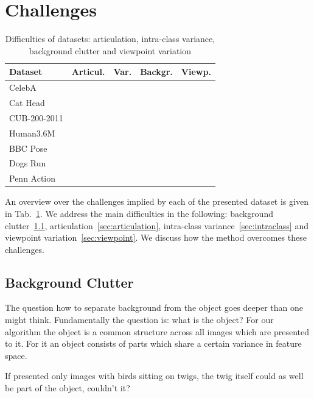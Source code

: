 
\section{Challenges}\label{sec:challenges}
	\begin{table}
		\centering
		\caption{Difficulties of datasets: articulation, intra-class variance, background clutter and viewpoint variation}
		\label{tab:challenges}
		\begin{tabular}{l|rrrr}
			\hline
			Dataset &  Articul.& Var. &  Backgr.& Viewp.  \\ \hline
			CelebA &   &  &  &    \\
			Cat Head & &  \checkmark&  &   \\
			CUB-200-2011 & & \checkmark& \checkmark&   \\
			Human3.6M &\checkmark& &  & \checkmark  \\
			BBC Pose &  \checkmark&  & \checkmark&  \\
			Dogs Run & \checkmark& \checkmark& \checkmark&   \\
			Penn Action & \checkmark& \checkmark& \checkmark& \checkmark  \\
			\hline
		\end{tabular}
	\end{table}
	An overview over the challenges implied by each of the presented dataset is given in Tab.~\ref{tab:challenges}. We address the main difficulties in the following: background clutter~\ref{sec:background}, articulation~\ref{sec:articulation}, intra-class variance~\ref{sec:intraclass} and viewpoint variation~\ref{sec:viewpoint}.
	We discuss how the method overcomes these challenges.



	\subsection{Background Clutter}\label{sec:background}

		The question how to separate background from the object goes deeper than one might think. Fundamentally the question is: what is the object?
		For our algorithm the object is a common structure across all images which are presented to it. For it an object consists of parts which share a certain variance in feature space.

		If presented only images with birds sitting on twigs, the twig itself could as well be part of the object, couldn't it?

